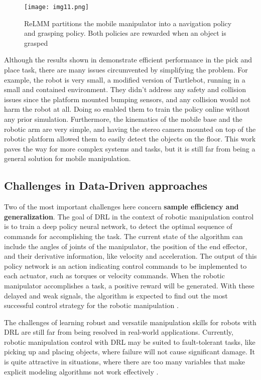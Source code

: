 \begin{figure}[ht]
	\centering
	\texttt{[image: img11.png]}
	\captionsetup{width=1\linewidth}
	\caption{ReLMM partitions the mobile manipulator into a navigation policy
		and grasping policy. Both policies are rewarded when an object is grasped
		\cite{sun2022relmm}}
	\label{fig:img11}
\end{figure}

Although the results shown in \cite{sun2022relmm} demonstrate efficient performance in
the pick and place task, there are many issues circumvented by simplifying the problem.
For example, the robot is very small, a modified version of Turtlebot, running in a small and
contained environment. They didn't address any safety and collision issues since the platform
mounted bumping sensors, and any collision would not harm the robot at all. Doing so enabled them
to train the policy online without any prior simulation.
Furthermore, the kinematics of the mobile base and the robotic arm are very simple, and having the
stereo camera mounted on top of the robotic platform allowed them to easily detect the objects
on the floor. This work paves the way for more complex systems and tasks, but it is still far
from being a general solution for mobile manipulation.

\subsection{Challenges in Data-Driven approaches}

Two of the most important challenges here concern \textbf{sample efficiency and generalization}.
The goal of DRL in the context of robotic manipulation
control is to train a deep policy neural network, to detect the optimal
sequence of commands for accomplishing the task. The current state of the algorithm can include
the angles of joints of the manipulator, the position of the end effector, and their derivative information,
like velocity and acceleration. The output of this policy network is an action indicating control
commands to be implemented to each actuator, such as torques or velocity commands. When the robotic manipulator
accomplishes a task, a positive reward will be generated. With these delayed and weak
signals, the algorithm is expected to find out the most successful control strategy for the
robotic manipulation \cite{liu2021deep}.

The challenges of learning robust and versatile manipulation skills
for robots with DRL are still far from being resolved in real-world applications.
Currently, robotic manipulation control with DRL may be suited to fault-tolerant
tasks, like picking up and placing objects, where failure will not cause significant damage.
It is quite attractive in situations, where there are too many
variables that make explicit modeling algorithms not work effectively \cite{liu2021deep}.

